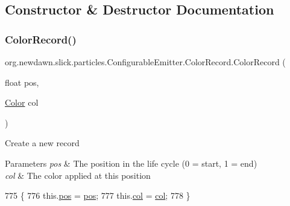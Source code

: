 \subsection{Constructor \& Destructor Documentation}
\mbox{\label{classorg_1_1newdawn_1_1slick_1_1particles_1_1_configurable_emitter_1_1_color_record_a4b3e46edc3f084bf227cbaa414154b48}} 
\subsubsection{\texorpdfstring{Color\+Record()}{ColorRecord()}}
{\footnotesize\ttfamily org.\+newdawn.\+slick.\+particles.\+Configurable\+Emitter.\+Color\+Record.\+Color\+Record (\begin{DoxyParamCaption}\item[{float}]{pos,  }\item[{\mbox{\hyperlink{classorg_1_1newdawn_1_1slick_1_1_color}{Color}}}]{col }\end{DoxyParamCaption})\hspace{0.3cm}{\ttfamily [inline]}}

Create a new record


\begin{DoxyParams}{Parameters}
{\em pos} & The position in the life cycle (0 = start, 1 = end) \\
\hline
{\em col} & The color applied at this position \\
\hline
\end{DoxyParams}

\begin{DoxyCode}
775                                                  \{
776             this.\mbox{\hyperlink{classorg_1_1newdawn_1_1slick_1_1particles_1_1_configurable_emitter_1_1_color_record_ac171c4542b32bd3f354c91d47621fbbc}{pos}} = \mbox{\hyperlink{classorg_1_1newdawn_1_1slick_1_1particles_1_1_configurable_emitter_1_1_color_record_ac171c4542b32bd3f354c91d47621fbbc}{pos}};
777             this.\mbox{\hyperlink{classorg_1_1newdawn_1_1slick_1_1particles_1_1_configurable_emitter_1_1_color_record_acb7e5871d3350b792a834ddf22c2e145}{col}} = \mbox{\hyperlink{classorg_1_1newdawn_1_1slick_1_1particles_1_1_configurable_emitter_1_1_color_record_acb7e5871d3350b792a834ddf22c2e145}{col}};
778         \}
\end{DoxyCode}


